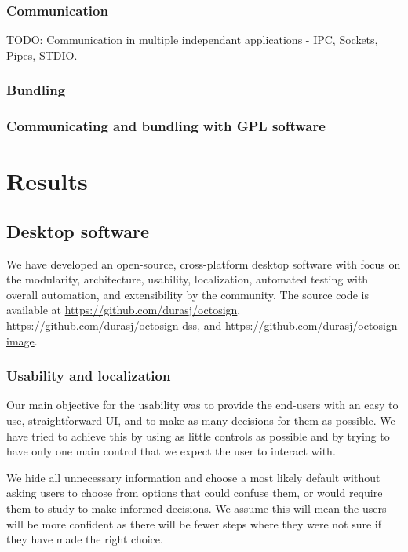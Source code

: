\documentclass[thesismargins, english, thesislinespacing, onelinechapterstyle, upjsfrontpage]{rnthesis}
\begin{document}
\subsection{Communication}

TODO: Communication in multiple independant applications - IPC, Sockets, Pipes, STDIO.

\subsection{Bundling}

\subsection{Communicating and bundling with GPL software}
\fi

\chapter{Results}

\section{Desktop software}

We have developed an open-source, cross-platform desktop software with focus on the modularity, architecture, usability, localization, automated testing with overall automation, and extensibility by the community.
The source code is available at \url{https://github.com/durasj/octosign}, \url{https://github.com/durasj/octosign-dss}, and \url{https://github.com/durasj/octosign-image}.

\subsection{Usability and localization}

Our main objective for the usability was to provide the end-users with an easy to use, straightforward UI, and to make as many decisions for them as possible.
We have tried to achieve this by using as little controls as possible and by trying to have only one main control that we expect the user to interact with.


We hide all unnecessary information and choose a most likely default without asking users to choose from options that could confuse them, or would require them to study to make informed decisions.
We assume this will mean the users will be more confident as there will be fewer steps where they were not sure if they have made the right choice.
\end{document}
